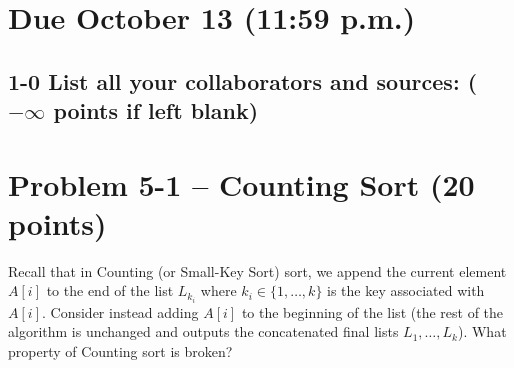 \runningheadrule
\firstpageheadrule
\cfoot{}

\section*{Due October 13 (11:59 p.m.)}
\intro

\subsection*{1-0 List all your collaborators and sources: (\texorpdfstring{$-\infty$}{-∞} points if left blank)}
\vspace{0.75cm}



\section*{Problem 5-1 -- Counting Sort (20 points)}

Recall that in Counting (or Small-Key Sort) sort, we append the current element $A[i]$ to the end of the list $L_{k_i}$ where $k_i \in \{1,\dots,k\}$ is the key associated with $A[i]$. Consider instead adding $A[i]$ to the beginning of the list (the rest of the algorithm is unchanged and outputs the concatenated final lists $L_1,\dots,L_k$). What property of Counting sort is broken? 

